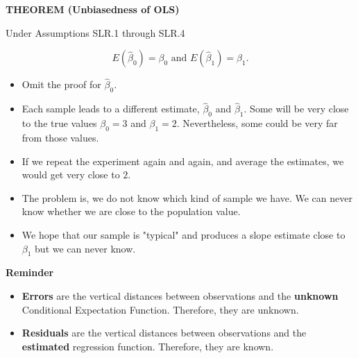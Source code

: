 \documentclass[notes=show]{beamer}
\begin{document}
\begin{frame}[plain]

\textbf{THEOREM (Unbiasedness of OLS)}

Under Assumptions SLR.1 through SLR.4

\begin{equation}
E(\hat{\beta}_{0})=\beta _{0}\text{ and }E(\hat{\beta}_{1})=\beta _{1}\text{.}
\end{equation}

 \begin{itemize}
  \item Omit the proof for $\hat{\beta}_{0}$.

 \end{itemize}
\end{frame}

\begin{frame}[plain]
 \begin{itemize}
  \item Each sample leads to a different estimate, $\hat{\beta}_{0}$ and $\hat{\beta}_{1}$. Some will be very close to the true values $\beta_{0}=3$ and $\beta_{1}=2$. Nevertheless, some could be very far from those values.

  \item If we repeat the experiment again and again, and average the estimates, we would get very close to $2$.

  \item The problem is, we do not know which kind of sample we have. We can never know whether we are close to the population value.

  \item We hope that our sample is "typical" and produces a slope estimate close to $\beta_{1} $ but we can never know.
 \end{itemize}
\end{frame}


\begin{frame}[plain]

\begin{center}
\textbf{Reminder}
\end{center}

\begin{itemize}
\item \textbf{Errors} are the vertical distances between observations and the \textbf{unknown} Conditional Expectation Function.  Therefore, they are unknown.
\item \textbf{Residuals} are the vertical distances between observations and the \textbf{estimated} regression function.  Therefore, they are known.
\end{itemize}

\end{frame}
\end{document}
